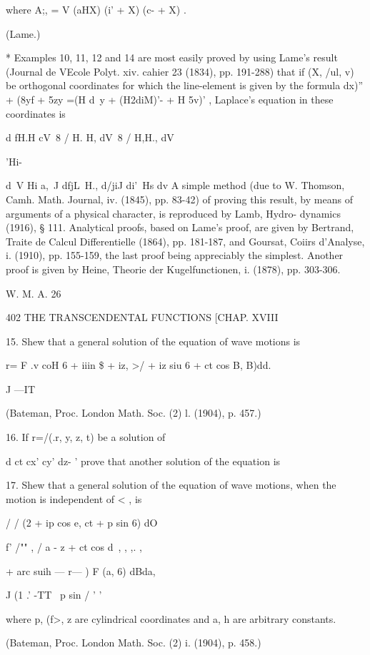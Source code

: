 where A;, = V (aHX) (i' + X) (c- + X) .

(Lame.)

* Examples 10, 11, 12 and 14 are most easily proved by using Lame's
result (Journal de VEcole Polyt. xiv. cahier 23 (1834), pp. 191-288)
that if (X, /ul, v) be orthogonal coordinates for which the
line-element is given by the formula dx)'' + (8yf + 5zy =(H d\ y +
(H2diM)'- + H 5v)' , Laplace's equation in these coordinates is

d fH.H cV\ 8 / H. H, dV\ 8 / H,H., dV\ \



'Hi-



d\ V Hi a,\ J dfjL\ H., d/jiJ di'\ Hs dv A simple method (due to W.
Thomson, Camh. Math. Journal, iv. (1845), pp. 83-42) of proving this
result, by means of arguments of a physical character, is reproduced
by Lamb, Hydro- dynamics (1916), § 111. Analytical proofs, based on
Lame's proof, are given by Bertrand, Traite de Calcul Differentielle
(1864), pp. 181-187, and Goursat, Coiirs d'Analyse, i. (1910), pp.
155-159, the last proof being appreciably the simplest. Another proof
is given by Heine, Theorie der Kugelfunctionen, i. (1878), pp.
303-306.

W. M. A. 26



402 THE TRANSCENDENTAL FUNCTIONS [CHAP. XVIII

15. Shew that a general solution of the equation of wave motions is

r= F .v coH 6 + iiin \$ + iz, >/ + iz siu 6 + ct cos B, B)dd.

J —IT

(Bateman, Proc. London Math. Soc. (2) l. (1904), p. 457.)

16. If r=/(.r, y, z, t) be a solution of

d ct cx' cy' dz- ' prove that another solution of the equation is

17. Shew that a general solution of the equation of wave motions, when
the motion is independent of < , is

/ / (2 + ip cos e, ct + p sin 6) dO

f' /"" , / a - z + ct cos d\ , , ,. ,

+ arc suih — r— ) F (a, 6) dBda,

J (1 .' -TT \ p sin / ' '

where p, (f>, z are cylindrical coordinates and a, h are arbitrary
constants.

(Bateman, Proc. London Math. Soc. (2) i. (1904), p. 458.)

